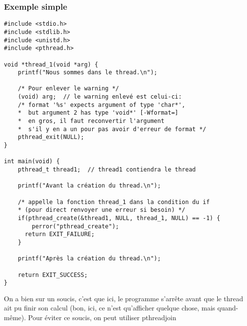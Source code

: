 \documentclass[a4paper]{article}
\begin{document}
\subsubsection{Exemple simple}
\begin{lstlisting}
#include <stdio.h>
#include <stdlib.h>
#include <unistd.h>
#include <pthread.h>

void *thread_1(void *arg) {
    printf("Nous sommes dans le thread.\n");

    /* Pour enlever le warning */
    (void) arg;  // le warning enlevé est celui-ci:
    /* format '%s' expects argument of type 'char*',
    *  but argument 2 has type 'void*' [-Wformat=]
    *  en gros, il faut reconvertir l'argument
    *  s'il y en a un pour pas avoir d'erreur de format */
    pthread_exit(NULL);
}

int main(void) {
    pthread_t thread1;  // thread1 contiendra le thread

    printf("Avant la création du thread.\n");

    /* appelle la fonction thread_1 dans la condition du if
    * (pour direct renvoyer une erreur si besoin) */
    if(pthread_create(&thread1, NULL, thread_1, NULL) == -1) {
	    perror("pthread_create");
      return EXIT_FAILURE;
    }

    printf("Après la création du thread.\n");

    return EXIT_SUCCESS;
}
\end{lstlisting}
On a bien sur un soucis, c'est que ici, le programme s'arrête avant que le thread ait pu finir son calcul (bon, ici, ce n'est qu'afficher quelque chose, mais quand-même). Pour éviter ce soucis, on peut utiliser \guillemotleft{} pthread\textunderscore{}join \guillemotright{}
\end{document}
